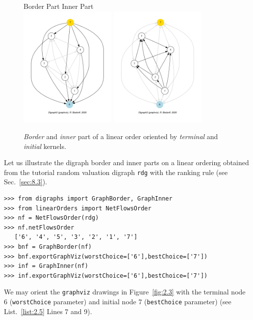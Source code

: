 \begin{figure}[ht]
  Border Part \hfill Inner Part \\
  \includegraphics[height=6cm]{Figures/2-3-linearOrderBorder.pdf}\hfill
  \includegraphics[height=6cm]{Figures/2-3-linearOrderInner.pdf}\hfill
\caption{\emph{Border} and \emph{inner} part of a linear order oriented by \emph{terminal} and \emph{initial} kernels.}
\label{fig:2.3}       %
\end{figure}
Let us illustrate the digraph border and inner parts on a linear ordering obtained from the tutorial random valuation digraph \texttt{rdg}  with the \NetFlows ranking rule  (see Sec.~\ref{sec:8.3}).  
\begin{lstlisting}[caption={Border and inner part of a linear order},label=list:2.5]
>>> from digraphs import GraphBorder, GraphInner
>>> from linearOrders import NetFlowsOrder
>>> nf = NetFlowsOrder(rdg)
>>> nf.netFlowsOrder
   ['6', '4', '5', '3', '2', '1', '7']
>>> bnf = GraphBorder(nf)
>>> bnf.exportGraphViz(worstChoice=['6'],bestChoice=['7'])
>>> inf = GraphInner(nf)
>>> inf.exportGraphViz(worstChoice=['6'],bestChoice=['7'])
\end{lstlisting}
We may orient the \texttt{graphviz} drawings in Figure~\vref{fig:2.3}  with the terminal node 6 (\texttt{worstChoice} parameter) and initial node 7 (\texttt{bestChoice} parameter) (see List.~\vref{list:2.5} Lines 7 and 9).

